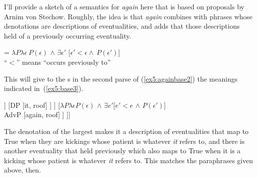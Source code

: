 I'll provide a sketch of a semantics for \emph{again} here that is based on proposals by Arnim von Stechow.\cite{vonStechow:1996} Roughly, the idea is that \emph{again} combines with phrases whose denotations are descriptions of eventualities, and adds that those descriptions held of a previously occurring eventuality.
\begin{exe}
	\raggedright
	\ex \label{ex5:againden} 
	 = $\lambda P \lambda \epsilon\ P(\epsilon)$ $\wedge$  $\exists \epsilon '$ [$\epsilon ' < \epsilon \wedge\ P(\epsilon ') ]$\\
	``$<$'' means ``occurs previously to''
\end{exe} 
This will give to the s in the second parse of (\ref{ex5:againbase2}) the meanings indicated in~(\ref{ex5:base3}).
\begin{fullwidth}
\begin{exe}
	\medskip
	\raggedright
	\ex \label{ex5:base3} 
	\hspace*{-20pt}
	\small
	\begin{forest}
	[$\lambda \epsilon$ \textsc{kick}($\epsilon$) $\wedge$ \textsc{patient}(it)($\epsilon$) $\wedge$ $\exists \epsilon'$ {[}$\epsilon' < \epsilon$ $\wedge$ \textsc{kick}($\epsilon'$) $\wedge$ \textsc{patient}(it)($\epsilon'$){]}\\ \ibar{V}
		[$\lambda \epsilon$ \textsc{kick}($\epsilon$) $\wedge$ \textsc{patient}(it)($\epsilon$)\\ \ibar{v} 
			[$\lambda x \lambda \epsilon$ \textsc{kick})($\epsilon$) $\wedge$ \textsc{patient}($x$)($\epsilon$)\\ \obar{V} [kick] ]
			[DP [it, roof] ]
		]
		[$\lambda P \lambda \epsilon P(\epsilon)$ $\wedge$ $\exists e' {[}e'<e$ $\wedge$ $P(\epsilon')${]}\\ AdvP [again, roof] ]
	]]
	\end{forest}
\end{exe}
\end{fullwidth}
The denotation of the largest  makes it a description of eventualities that map to True when they are kickings whose patient is whatever \emph{it} refers to, and there is another eventuality that held previously which also maps to True when it is a kicking whose patient is whatever \emph{it} refers to. This matches the paraphrases given above, then.

